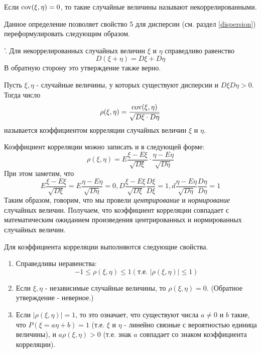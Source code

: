 \begin{definition}
	Если $\operatorname{\mathop{cov}} (\xi, \eta) = 0$, то такие случайные величины называют некоррелированными.
	
	Данное определение позволяет свойство 5 для дисперсии (см. раздел \ref{dispersion}) переформулировать следующим образом.
	
	'. Для некоррелированных случайных величин $\xi$ и $\eta$ справедливо равенство
	\[ D(\xi + \eta) = D\xi + D\eta \]
	В обратную сторону это утверждение также верно.
\end{definition}

\begin{definition}
	Пусть $\xi, \eta$ - случайные величины, у которых существуют дисперсии и $D\xi D\eta > 0$. Тогда число
	\[ \rho (\xi, \eta) = \frac{\operatorname{\mathop{cov}} (\xi, \eta)}{\sqrt{D\xi \cdot D\eta}} \]
	называется коэффициентом корреляции случайных величин $\xi$ и $\eta$.
\end{definition}

\begin{remark}
	Коэффициент корреляции можно записать и в следующей форме:
	\[ \rho (\xi, \eta) = E \frac{\xi - E \xi}{\sqrt{D \xi}} \cdot \frac{\eta - E\eta}{\sqrt{D \eta}} \]
	При этом заметим, что
	\[ E \frac{\xi - E\xi}{\sqrt{D \xi}} = E \frac{\eta - E \eta}{\sqrt{D \eta}} = 0, D \frac{\xi - E \xi}{\sqrt{D \xi}} \frac{D \xi}{D\xi} = 1, d \frac{\eta - E \eta}{\sqrt{D \eta}} \frac{D \eta}{D \eta} = 1 \]
	Таким образом, говорим, что мы провели \textit{центрирование} и \textit{нормирование} случайных величин. Получаем, что коэффициент корреляции совпадает с математическим ожиданием произведения центрированных и нормированных случайных величин.
\end{remark}

Для коэффициента корреляции выполняются следующие свойства.

\begin{enumerate}
	\item Справедливы неравенства:
	\[ -1 \le \rho (\xi, \eta) \le 1 (\text{т.е. } |\rho(\xi, \eta)| \le 1) \]
	\item Если $\xi, \eta$ - независимые случайные величины, то $\rho (\xi, \eta) = 0$. (Обратное утверждение - неверное.)
	\item Если $|\rho(\xi, \eta)| = 1$, то это означает, что существуют числа $a \ne 0$ и $b$ такие, что $P(\xi = a\eta + b) = 1$ (т.е. $\xi$ и $\eta$ - линейно связные с вероятностью единица величины), и $a \rho(\xi, \eta)>0$ (т.е. знак $a$ совпадает со знаком коэффициента корреляции).
\end{enumerate}

